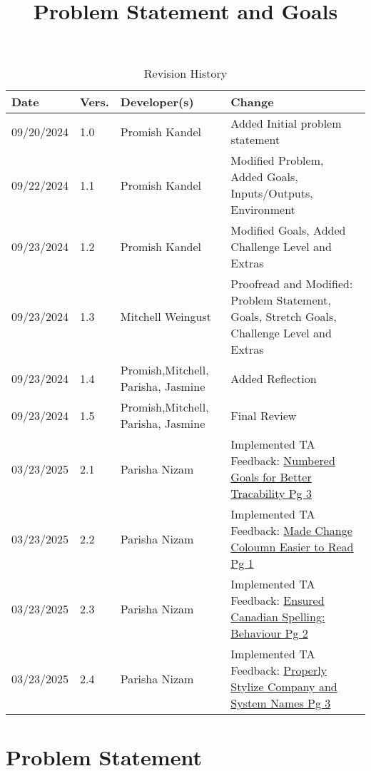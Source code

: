 \documentclass{article}
\title{Problem Statement and Goals\\\progname}
\author{\authname}
\date{}
\begin{document}
\maketitle


\begin{table}[hp]
    \caption{Revision History} \label{TblRevisionHistory}
    \begin{tabularx}{\textwidth}{p{1.5cm}p{1cm}p{3cm}X}
    \toprule {\textbf{Date}} & {\textbf{Vers.}} & {\textbf{Developer(s)}} & {\textbf{Change}}\\
    \midrule
    09/20/2024 & 1.0 & Promish Kandel & Added Initial problem statement\\
    09/22/2024 & 1.1 & Promish Kandel & Modified Problem, Added Goals, Inputs/Outputs, Environment\\
    09/23/2024 & 1.2 & Promish Kandel & Modified Goals, Added Challenge Level and Extras\\
    09/23/2024 & 1.3 & Mitchell Weingust & Proofread and Modified: Problem Statement, Goals, Stretch Goals, Challenge Level and Extras\\
    09/23/2024 & 1.4 & Promish,Mitchell, Parisha, Jasmine & Added Reflection \\
    09/23/2024 & 1.5 & Promish,Mitchell, Parisha, Jasmine & Final Review \\
    03/23/2025 & 2.1 & Parisha Nizam & Implemented TA Feedback: \href{https://github.com/parishanizam/TeleHealth/issues/181}{Numbered Goals for Better Tracability Pg 3} \\
    03/23/2025 & 2.2 & Parisha Nizam & Implemented TA Feedback: \href{https://github.com/parishanizam/TeleHealth/issues/182}{Made Change Coloumn Easier to Read Pg 1} \\
    03/23/2025 & 2.3 & Parisha Nizam & Implemented TA Feedback: \href{https://github.com/parishanizam/TeleHealth/issues/183}{Ensured Canadian Spelling: Behaviour Pg 2} \\
    03/23/2025 & 2.4 & Parisha Nizam & Implemented TA Feedback: \href{https://github.com/parishanizam/TeleHealth/issues/184}{Properly Stylize Company and System Names Pg 3} \\
    \bottomrule
    \end{tabularx}
\end{table}

\section{Problem Statement}
\end{document}
